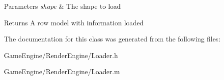 \begin{DoxyParams}{Parameters}
{\em shape} & The shape to load\\
\hline
\end{DoxyParams}
\begin{DoxyReturn}{Returns}
A row model with information loaded 
\end{DoxyReturn}


The documentation for this class was generated from the following files\+:\begin{DoxyCompactItemize}
\item 
Game\+Engine/\+Render\+Engine/Loader.\+h\item 
Game\+Engine/\+Render\+Engine/Loader.\+m\end{DoxyCompactItemize}
